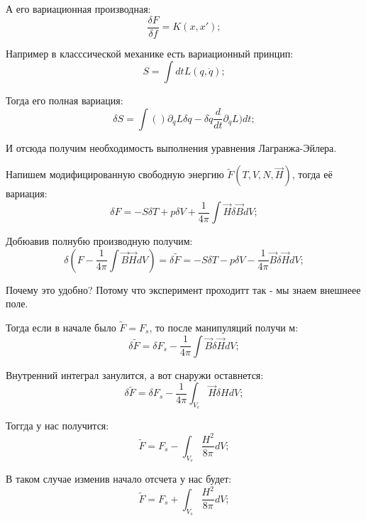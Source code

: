 \documentclass[a4paper, 14pt, russian]{article}
\newcommand{\be}{\begin{equation}}
\newcommand{\ee}{\end{equation}}
\newcommand{\pa}{\partial}
\begin{document}
	А его вариационная производная:
	\be
		\frac{\delta F}{\delta f} = K(x, x');
	\ee

	Например в класссической механике есть вариационный принцип:
	\be
		S = \int dt L(q, \dot q);
	\ee

	Тогда его полная вариация:
	\be
		\delta S = \int ()\pa_q L \delta q - \delta \dot q \frac{d}{dt} \pa_{\dot q} L) dt;
	\ee

	И отсюда получим необходимость выполнения уравнения Лагранжа-Эйлера.

	Напишем модифицированную свободную энергию $\tilde{F}(T,V,N, \vec H)$, тогда
	её вариация:
	\be
		\delta F = - S \delta T + p \delta V + \frac{1}{4\pi} \int \vec H \delta \vec B dV;
	\ee

	Добюавив полнубю производную получим:
	\be
		\delta (F  - \frac{1}{4\pi} \int \vec B \vec H d V) = \delta \tilde{F} = - S \delta T - p \delta V - \frac{1}{4\pi} \vec B \delta \vec H dV;
	\ee

	Почему это удобно? Потому что эксперимент проходитт так - мы знаем внешнеее поле.

	Тогда если в начале было $\tilde{F} = F_s$, то после манипуляций получи м:
	\be
		\delta \tilde{F} = \delta F_s - \frac{1}{4\pi} \int \vec B \delta \vec H dV;
	\ee

	Внутренний интеграл занулится, а вот снаружи оставнется:
	\be
		\delta \tilde{F} = \delta F_s - \frac{1}{4\pi} \int_{V_e} \vec H \delta H dV;
	\ee

	Тоггда у нас получится:
	\be
		\tilde F = F_s - \int_{V_e} \frac{H^2}{8 \pi} dV;
	\ee

	В таком случае изменив начало отсчета у нас будет:
	\be
		\tilde F = F_s + \int_{V_s} \frac{H^2}{8\pi} dV;
	\ee
\end{document}
